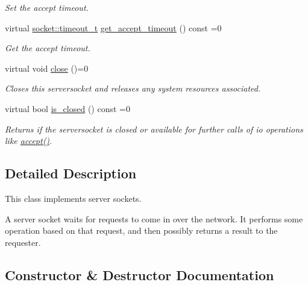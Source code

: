 \begin{DoxyCompactItemize}
\begin{DoxyCompactList}\small\item\em Set the accept timeout. \end{DoxyCompactList}\item 
virtual \hyperlink{structdevfix_1_1net_1_1socket_a80a3bf4cb7292bae31ea9c6575539c68}{socket\+::timeout\+\_\+t} \hyperlink{structdevfix_1_1net_1_1serversocket_a9c27c5bcd0adb034fe069ae67e0114c5}{get\+\_\+accept\+\_\+timeout} () const =0
\begin{DoxyCompactList}\small\item\em Get the accept timeout. \end{DoxyCompactList}\item 
virtual void \hyperlink{structdevfix_1_1net_1_1serversocket_ab1762c3364c8298dbac6c3dd67a1e7aa}{close} ()=0
\begin{DoxyCompactList}\small\item\em Closes this {\itshape serversocket} and releases any system resources associated. \end{DoxyCompactList}\item 
virtual bool \hyperlink{structdevfix_1_1net_1_1serversocket_a852c0aa25c375834487ffc0e8d818221}{is\+\_\+closed} () const =0
\begin{DoxyCompactList}\small\item\em Returns if the {\itshape serversocket} is closed or available for further calls of io operations like \hyperlink{structdevfix_1_1net_1_1serversocket_a7b3ea6aad486060acdd1385a08f7db81}{accept()}. \end{DoxyCompactList}\end{DoxyCompactItemize}


\subsection{Detailed Description}
This class implements server sockets. 

A server socket waits for requests to come in over the network. It performs some operation based on that request, and then possibly returns a result to the requester. 

\subsection{Constructor \& Destructor Documentation}
\mbox{\label{structdevfix_1_1net_1_1serversocket_afd9f315c4018808c790478710f52d8ab}} 
